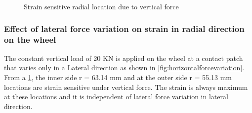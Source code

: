 \documentclass[]{interact}
\theoremstyle{plain}%
\theoremstyle{definition}
\theoremstyle{remark}
\begin{document}
\begin{figure}
\centering
{}
\caption{Strain sensitive radial location due to vertical force } \label{fig:strainvertical}
\end{figure}


\subsubsection{Effect of lateral force variation on strain in radial direction on the wheel}
The constant vertical load of 20 KN is applied on the wheel at a contact patch that varies only in a Lateral direction as shown in   \cref{fig:horizontalforcevariation}. From a \cref{fig:strainvertical}, the inner side r = 63.14 mm and at the outer side r = 55.13 mm locations are strain sensitive under vertical force. The strain is always maximum at these locations and it is independent of lateral force variation in lateral direction. 
\end{document}
